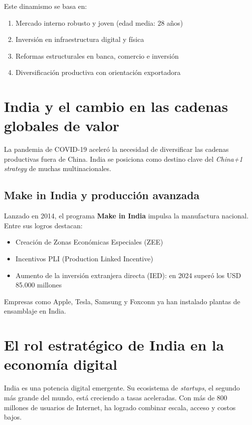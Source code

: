 \documentclass[12pt]{article}
\begin{document}
Este dinamismo se basa en:

\begin{enumerate}[label=\alph*)]
  \item Mercado interno robusto y joven (edad media: 28 años)
  \item Inversión en infraestructura digital y física
  \item Reformas estructurales en banca, comercio e inversión
  \item Diversificación productiva con orientación exportadora
\end{enumerate}

\section{India y el cambio en las cadenas globales de valor}

La pandemia de COVID-19 aceleró la necesidad de diversificar las cadenas productivas fuera de China. India se posiciona como destino clave del \textit{China+1 strategy} de muchas multinacionales.

\subsection*{Make in India y producción avanzada}

Lanzado en 2014, el programa \textbf{Make in India} impulsa la manufactura nacional. Entre sus logros destacan:

\begin{itemize}
  \item Creación de Zonas Económicas Especiales (ZEE)
  \item Incentivos PLI (Production Linked Incentive)
  \item Aumento de la inversión extranjera directa (IED): en 2024 superó los USD 85.000 millones
\end{itemize}

Empresas como Apple, Tesla, Samsung y Foxconn ya han instalado plantas de ensamblaje en India.

\section{El rol estratégico de India en la economía digital}

India es una potencia digital emergente. Su ecosistema de \textit{startups}, el segundo más grande del mundo, está creciendo a tasas aceleradas. Con más de 800 millones de usuarios de Internet, ha logrado combinar escala, acceso y costos bajos.
\end{document}
